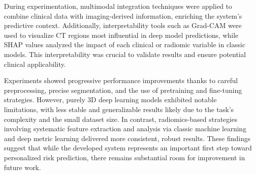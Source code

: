 During experimentation, multimodal integration techniques were applied to combine clinical data with imaging-derived information, enriching the system's predictive context. Additionally, interpretability tools such as Grad-CAM were used to visualize CT regions most influential in deep model predictions, while SHAP values analyzed the impact of each clinical or radiomic variable in classic models. This interpretability was crucial to validate results and ensure potential clinical applicability.

Experiments showed progressive performance improvements thanks to careful preprocessing, precise segmentation, and the use of pretraining and fine-tuning strategies. However, purely 3D deep learning models exhibited notable limitations, with less stable and generalizable results likely due to the task’s complexity and the small dataset size. In contrast, radiomics-based strategies involving systematic feature extraction and analysis via classic machine learning and deep metric learning delivered more consistent, robust results. These findings suggest that while the developed system represents an important first step toward personalized risk prediction, there remains substantial room for improvement in future work.




\endinput
